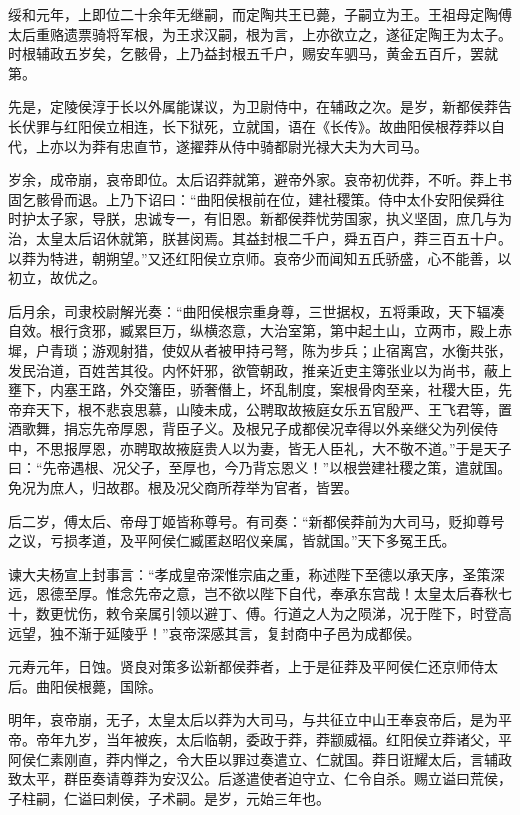 \documentclass[12pt,UTF8]{ctexbook}
\begin{document}
绥和元年，上即位二十余年无继嗣，而定陶共王已薨，子嗣立为王。王祖母定陶傅太后重赂遗票骑将军根，为王求汉嗣，根为言，上亦欲立之，遂征定陶王为太子。时根辅政五岁矣，乞骸骨，上乃益封根五千户，赐安车驷马，黄金五百斤，罢就第。



先是，定陵侯淳于长以外属能谋议，为卫尉侍中，在辅政之次。是岁，新都侯莽告长伏罪与红阳侯立相连，长下狱死，立就国，语在《长传》。故曲阳侯根荐莽以自代，上亦以为莽有忠直节，遂擢莽从侍中骑都尉光禄大夫为大司马。



岁余，成帝崩，哀帝即位。太后诏莽就第，避帝外家。哀帝初优莽，不听。莽上书固乞骸骨而退。上乃下诏曰：“曲阳侯根前在位，建社稷策。侍中太仆安阳侯舜往时护太子家，导朕，忠诚专一，有旧恩。新都侯莽忧劳国家，执义坚固，庶几与为治，太皇太后诏休就第，朕甚闵焉。其益封根二千户，舜五百户，莽三百五十户。以莽为特进，朝朔望。”又还红阳侯立京师。哀帝少而闻知五氏骄盛，心不能善，以初立，故优之。



后月余，司隶校尉解光奏：“曲阳侯根宗重身尊，三世据权，五将秉政，天下辐凑自效。根行贪邪，臧累巨万，纵横恣意，大治室第，第中起土山，立两市，殿上赤墀，户青琐；游观射猎，使奴从者被甲持弓弩，陈为步兵；止宿离宫，水衡共张，发民治道，百姓苦其役。内怀奸邪，欲管朝政，推亲近吏主簿张业以为尚书，蔽上壅下，内塞王路，外交籓臣，骄奢僭上，坏乱制度，案根骨肉至亲，社稷大臣，先帝弃天下，根不悲哀思慕，山陵未成，公聘取故掖庭女乐五官殷严、王飞君等，置酒歌舞，捐忘先帝厚恩，背臣子义。及根兄子成都侯况幸得以外亲继父为列侯侍中，不思报厚恩，亦聘取故掖庭贵人以为妻，皆无人臣礼，大不敬不道。”于是天子曰：“先帝遇根、况父子，至厚也，今乃背忘恩义！”以根尝建社稷之策，遣就国。免况为庶人，归故郡。根及况父商所荐举为官者，皆罢。



后二岁，傅太后、帝母丁姬皆称尊号。有司奏：“新都侯莽前为大司马，贬抑尊号之议，亏损孝道，及平阿侯仁臧匿赵昭仪亲属，皆就国。”天下多冤王氏。



谏大夫杨宣上封事言：“孝成皇帝深惟宗庙之重，称述陛下至德以承天序，圣策深远，恩德至厚。惟念先帝之意，岂不欲以陛下自代，奉承东宫哉！太皇太后春秋七十，数更忧伤，敕令亲属引领以避丁、傅。行道之人为之陨涕，况于陛下，时登高远望，独不渐于延陵乎！”哀帝深感其言，复封商中子邑为成都侯。



元寿元年，日蚀。贤良对策多讼新都侯莽者，上于是征莽及平阿侯仁还京师侍太后。曲阳侯根薨，国除。



明年，哀帝崩，无子，太皇太后以莽为大司马，与共征立中山王奉哀帝后，是为平帝。帝年九岁，当年被疾，太后临朝，委政于莽，莽颛威福。红阳侯立莽诸父，平阿侯仁素刚直，莽内惮之，令大臣以罪过奏遣立、仁就国。莽日诳耀太后，言辅政致太平，群臣奏请尊莽为安汉公。后遂遣使者迫守立、仁令自杀。赐立谥曰荒侯，子柱嗣，仁谥曰刺侯，子术嗣。是岁，元始三年也。
\end{document}
